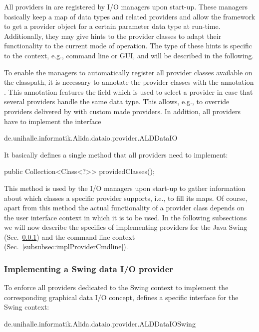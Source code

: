 All providers in \alida are registered by I/O managers upon start-up. These managers basically
keep a map of data types and related providers and allow the framework to get a provider object
for a certain parameter data type at run-time. 
Additionally, they may give hints to the provider classes to adapt their
functionality to the current mode of operation.
The type of these hints is specific to the context, e.g., command line or GUI,
and will be described in the following.

To enable the managers to automatically register 
all provider classes available on the classpath, it is necessary to annotate the
provider classes with the \alida annotation . 
This annotation features the field  which is used to
select a provider in case that several providers handle the same data type.
This allows, e.g., to override providers delivered by \alida with custom made providers.
In addition, all providers have to 
implement the interface 
\vspace*{0.5cm}
\begin{code}
	de.unihalle.informatik.Alida.dataio.provider.ALDDataIO 
\end{code}

\vspace*{-0.25cm}
It basically defines a single method that all providers need to implement:
\vspace*{0.5cm}
\begin{code}
	public Collection<Class<?>> providedClasses();
\end{code}

\vspace*{-0.25cm}
This method is used by the I/O managers upon start-up to gather information about
which classes a specific provider supports, i.e., to fill its maps. Of course,
apart from this method the actual functionality of a provider class depends on the user interface 
context in which it is to be used. In the following subsections we will now describe the specifics
of implementing providers for the Java Swing (Sec.~\ref{subsubsec:implProviderSwing}) and 
the command line context (Sec.~\ref{subsubsec:implProviderCmdline}).
  
\subsubsection{Implementing a Swing data I/O provider}
\label{subsubsec:implProviderSwing}
To enforce all providers dedicated to the Swing context to implement the corresponding graphical 
data I/O concept, \alida defines a specific interface for the Swing context: 
\vspace*{0.5cm}
\begin{code}
	de.unihalle.informatik.Alida.dataio.provider.ALDDataIOSwing 
\end{code}

